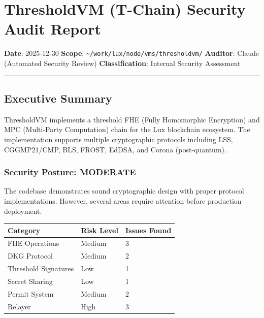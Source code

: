 \documentclass[
]{article}
\author{}
\date{}
\newcounter{none} %
\begin{document}
\section{ThresholdVM (T-Chain) Security Audit
Report}\label{thresholdvm-t-chain-security-audit-report}

\textbf{Date}: 2025-12-30 \textbf{Scope}:
\texttt{\textasciitilde{}/work/lux/node/vms/thresholdvm/}
\textbf{Auditor}: Claude (Automated Security Review)
\textbf{Classification}: Internal Security Assessment

\begin{center}\rule{0.5\linewidth}{0.5pt}\end{center}

\subsection{Executive Summary}\label{executive-summary}

ThresholdVM implements a threshold FHE (Fully Homomorphic Encryption)
and MPC (Multi-Party Computation) chain for the Lux blockchain
ecosystem. The implementation supports multiple cryptographic protocols
including LSS, CGGMP21/CMP, BLS, FROST, EdDSA, and Corona
(post-quantum).

\subsubsection{\texorpdfstring{Security Posture:
\textbf{MODERATE}}{Security Posture: MODERATE}}\label{security-posture-moderate}

The codebase demonstrates sound cryptographic design with proper
protocol implementations. However, several areas require attention
before production deployment.

{\def\LTcaptype{none} %
\begin{longtable}[]{@{}lll@{}}
\toprule\noalign{}
Category & Risk Level & Issues Found \\
\midrule\noalign{}
\endhead
\bottomrule\noalign{}
\endlastfoot
FHE Operations & Medium & 3 \\
DKG Protocol & Medium & 2 \\
Threshold Signatures & Low & 1 \\
Secret Sharing & Low & 1 \\
Permit System & Medium & 2 \\
Relayer & High & 3 \\
\end{longtable}
}
\end{document}
